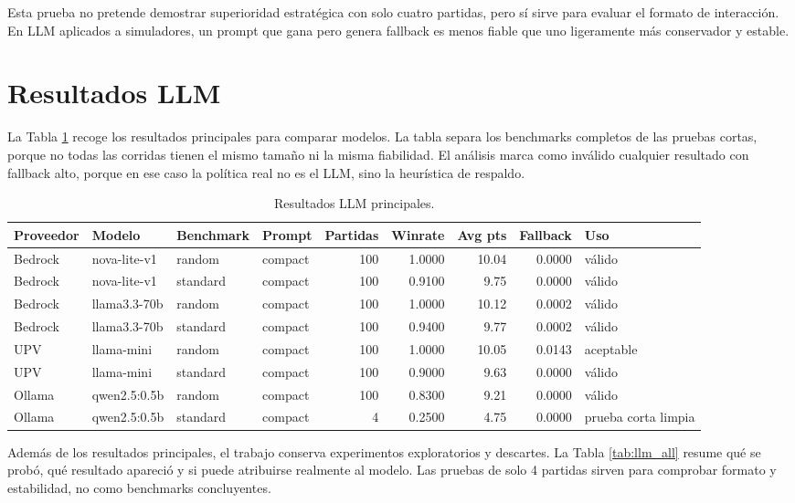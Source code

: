 ﻿\documentclass[10pt,a4paper]{article}
\begin{document}
Esta prueba no pretende demostrar superioridad estratégica con solo cuatro partidas, pero sí sirve para evaluar el formato de interacción. En LLM aplicados a simuladores, un prompt que gana pero genera fallback es menos fiable que uno ligeramente más conservador y estable.

\section{Resultados LLM}
La Tabla \ref{tab:llm} recoge los resultados principales para comparar modelos. La tabla separa los benchmarks completos de las pruebas cortas, porque no todas las corridas tienen el mismo tamaño ni la misma fiabilidad. El análisis marca como inválido cualquier resultado con fallback alto, porque en ese caso la política real no es el LLM, sino la heurística de respaldo.

\begin{table}[H]
\centering
\scriptsize
\begin{tabular}{llllrrrrl}
\toprule
Proveedor & Modelo & Benchmark & Prompt & Partidas & Winrate & Avg pts & Fallback & Uso \\
\midrule
Bedrock & nova-lite-v1 & random & compact & 100 & 1.0000 & 10.04 & 0.0000 & válido \\
Bedrock & nova-lite-v1 & standard & compact & 100 & 0.9100 & 9.75 & 0.0000 & válido \\
Bedrock & llama3.3-70b & random & compact & 100 & 1.0000 & 10.12 & 0.0002 & válido \\
Bedrock & llama3.3-70b & standard & compact & 100 & 0.9400 & 9.77 & 0.0002 & válido \\
UPV & llama-mini & random & compact & 100 & 1.0000 & 10.05 & 0.0143 & aceptable \\
UPV & llama-mini & standard & compact & 100 & 0.9000 & 9.63 & 0.0000 & válido \\
Ollama & qwen2.5:0.5b & random & compact & 100 & 0.8300 & 9.21 & 0.0000 & válido \\
Ollama & qwen2.5:0.5b & standard & compact & 4 & 0.2500 & 4.75 & 0.0000 & prueba corta limpia \\
\bottomrule
\end{tabular}
\caption{Resultados LLM principales.}
\label{tab:llm}
\end{table}

Además de los resultados principales, el trabajo conserva experimentos exploratorios y descartes. La Tabla \ref{tab:llm_all} resume qué se probó, qué resultado apareció y si puede atribuirse realmente al modelo. Las pruebas de solo 4 partidas sirven para comprobar formato y estabilidad, no como benchmarks concluyentes.
\end{document}
